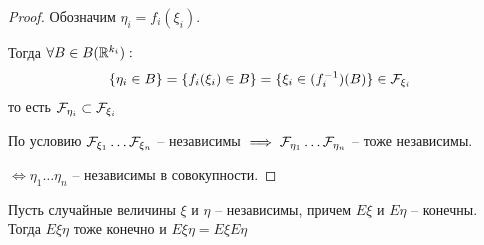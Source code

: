 \begin{proof}
  Обозначим $\eta_i = f_i (\xi_i)$. 

  Тогда $\forall B \in B(\mathbb{R}^{k_i}):$
  \begin{align*}
    \{ \eta_i \in B \} = \{ f_i (\xi_i) \in B \} = \{ \xi_i \in (f_i^{-1}) (B) \} \in \mathcal{F}_{\xi_i}
  \end{align*}
  то есть $\mathcal{F}_{\eta_i} \subset \mathcal{F}_{\xi_i}$

  По условию $\mathcal{F}_{\xi_1} \ldots \mathcal{F}_{\xi_n}$ -- независимы
  $\implies \mathcal{F}_{\eta_1} \ldots \mathcal{F}_{\eta_n}$ -- тоже независимы.

  $\iff \eta_1 \ldots \eta_n$ -- независимы в совокупности.
\end{proof}

\begin{theorem}
  Пусть случайные величины $\xi$ и $\eta$ -- независимы, причем $E \xi$ и $E \eta$ -- конечны. 
  Тогда $E \xi \eta$ тоже конечно и $E \xi \eta = E \xi E \eta$
\end{theorem}

